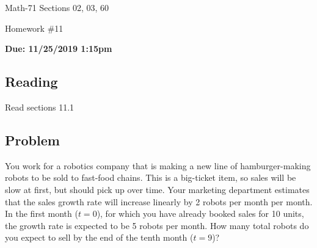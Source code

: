 \documentclass[letterpaper,12pt,fleqn]{article}
\begin{document}
\begin{center}
  \large
  Math-71 Sections 02, 03, 60

  \Large
  Homework \#11

  \large\textbf{Due: 11/25/2019 1:15pm}
\end{center}

\subsection*{Reading}

Read sections 11.1

\subsection*{Problem}

You work for a robotics company that is making a new line of hamburger-making robots to be sold to fast-food
chains.  This is a big-ticket item, so sales will be slow at first, but should pick up over time.  Your marketing
department estimates that the sales growth rate will increase linearly by 2 robots per month per month.  In the
first month (\(t=0\)), for which you have already booked sales for 10 units, the growth rate is expected to be 5
robots per month.  How many total robots do you expect to sell by the end of the tenth month (\(t=9\))?
\end{document}
